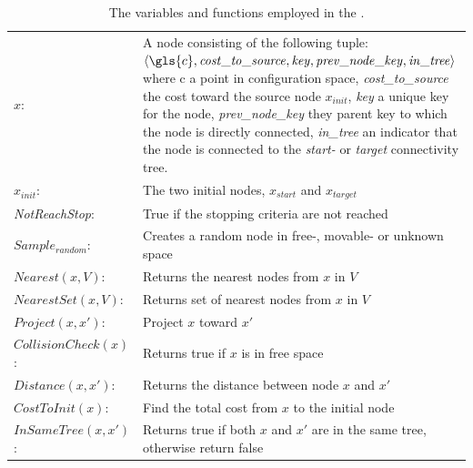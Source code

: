\noindent
\begin{table}[H]
\centering
  \begin{tabular}%
  {>{\raggedright\arraybackslash}p{}%
   >{\raggedright\arraybackslash}p{}}
   $x$:& A node consisting of the following tuple: $ \left\langle \gls{c}, \mathit{cost\_to\_source}, \mathit{key}, \mathit{prev\_node\_key}, \mathit{in\_tree} \right\rangle$ where \gls{c} a point in configuration space, \textit{cost\_to\_source} the cost toward the source node $x_{init}$, \textit{key} a unique key for the node, \textit{prev\_node\_key} they parent key to which the node is directly connected, \textit{in\_tree} an indicator that the node is connected to the \textit{start-} or \textit{target} connectivity tree.\\
   $x_{init}$:& The two initial nodes, $x_{\mathit{start}}$ and $x_{\mathit{target}}$\\
  \textit{NotReachStop}:& True if the stopping criteria are not reached\\
  $\mathit{Sample_{random}}$:& Creates a random node in free-, movable- or unknown space\\
  $\mathit{Nearest}(x, V)$:& Returns the nearest nodes from $x$ in $V$\\
  $\mathit{NearestSet}(x, V)$:& Returns set of nearest nodes from $x$ in $V$\\
  $\mathit{Project}(x, x')$:& Project $x$ toward $x'$\\
  $\mathit{CollisionCheck}(x)$:& Returns true if $x$ is in free space\\
  $\mathit{Distance}(x, x')$:& Returns the distance between node $x$ and $x'$\\
  $\mathit{CostToInit}(x)$:& Find the total cost from $x$ to the initial node\\
    $\mathit{InSameTree}(x, x')$:& Returns true if both $x$ and $x'$ are in the same tree, otherwise return false\\
  \end{tabular}
\caption{The variables and functions employed in the .}
\label{table:functions_for_proposed_rrt_star}
\end{table}

